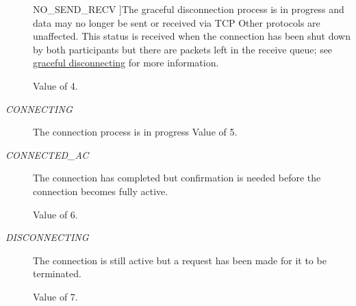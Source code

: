 \begin{Desc}
\begin{description}
{\hypertarget{classcl_networking_utility_a15dd34683154e07d5843f8f5432fec6da049f6833fe3ed9d08cfe5047078b73e3}{
NO\_\-SEND\_\-RECV}
\label{classcl_networking_utility_a15dd34683154e07d5843f8f5432fec6da049f6833fe3ed9d08cfe5047078b73e3}
}]The graceful disconnection process is in progress and data may no longer be sent or received via TCP Other protocols are unaffected. This status is received when the connection has been shut down by both participants but there are packets left in the receive queue; see \hyperlink{graceful_disconnect_page}{graceful disconnecting} for more information. \par
 Value of 4. \item[{\em 
\hypertarget{classcl_networking_utility_a15dd34683154e07d5843f8f5432fec6dabf4d0d3d12524780c743ee1262fbc278}{
CONNECTING}
\label{classcl_networking_utility_a15dd34683154e07d5843f8f5432fec6dabf4d0d3d12524780c743ee1262fbc278}
}]The connection process is in progress Value of 5. \item[{\em 
\hypertarget{classcl_networking_utility_a15dd34683154e07d5843f8f5432fec6dae6a68187523a21d25bdd2eaa92efc79d}{
CONNECTED\_\-AC}
\label{classcl_networking_utility_a15dd34683154e07d5843f8f5432fec6dae6a68187523a21d25bdd2eaa92efc79d}
}]The connection has completed but confirmation is needed before the connection becomes fully active. \par
 Value of 6. \item[{\em 
\hypertarget{classcl_networking_utility_a15dd34683154e07d5843f8f5432fec6dafad5daa966b363b76ea786a199121a28}{
DISCONNECTING}
\label{classcl_networking_utility_a15dd34683154e07d5843f8f5432fec6dafad5daa966b363b76ea786a199121a28}
}]The connection is still active but a request has been made for it to be terminated. \par
 Value of 7. \end{description}
\end{Desc}

